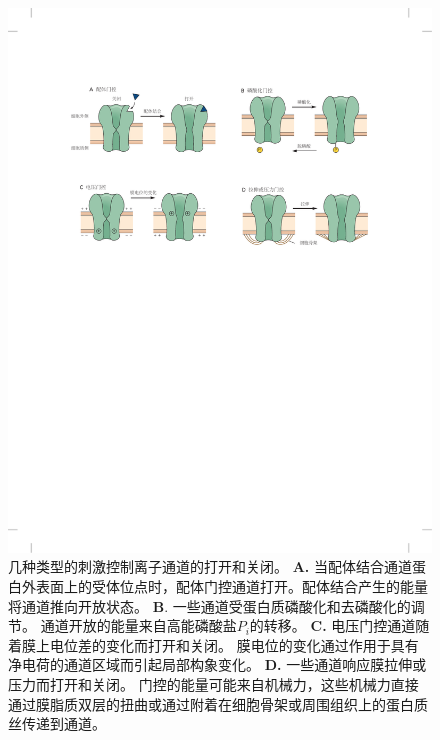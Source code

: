 \begin{figure}[htbp]
	\centering
	\includegraphics[width=0.95\linewidth]{chap08/fig_8_5}
	\caption{几种类型的刺激控制离子通道的打开和关闭。
		\textbf{A.} 当配体结合通道蛋白外表面上的受体位点时，配体门控通道打开。配体结合产生的能量将通道推向开放状态。
		\textbf{B}. 一些通道受蛋白质磷酸化和去磷酸化的调节。
		通道开放的能量来自高能磷酸盐$P_i$的转移。
		\textbf{C.} 电压门控通道随着膜上电位差的变化而打开和关闭。
		膜电位的变化通过作用于具有净电荷的通道区域而引起局部构象变化。
		\textbf{D.} 一些通道响应膜拉伸或压力而打开和关闭。
		门控的能量可能来自机械力，这些机械力直接通过膜脂质双层的扭曲或通过附着在细胞骨架或周围组织上的蛋白质丝传递到通道。}
	\label{fig:8_5}
\end{figure}


